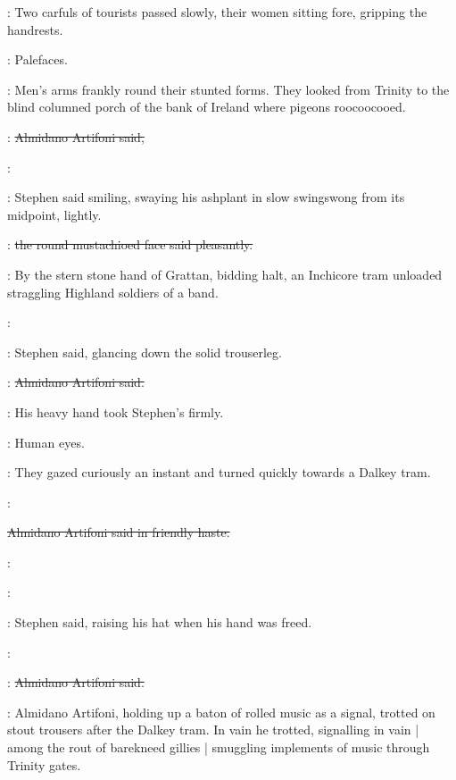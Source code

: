 :
Two carfuls of tourists passed slowly,
their women sitting fore,
gripping the handrests.

\StephenInt:
Palefaces.

:
Men's arms frankly round their stunted forms.
They looked from Trinity
to the blind columned porch of the bank of Ireland
where pigeons roocoocooed.

\artifoni:
\sout{Almidano Artifoni said,}

\Stephen:

:
Stephen said smiling,
swaying his ashplant in slow swingswong from its midpoint,
lightly.

\artifoni:
\sout{the round mustachioed face said pleasantly.}

:
By the stern stone hand of Grattan,
bidding halt,
an Inchicore tram unloaded straggling Highland soldiers of a band.

\Stephen:

:
Stephen said,
glancing down the solid trouserleg.

\artifoni:
\sout{Almidano Artifoni said.}

:
His heavy hand took Stephen's firmly.

\StephenInt:
Human eyes.

:
They gazed curiously an instant and turned quickly towards a Dalkey tram.

\artifoni:

\sout{Almidano Artifoni said in friendly haste.}

\artifoni:

\Stephen:

:
Stephen said,
raising his hat when his hand was freed.

\Stephen:

\artifoni:
\sout{Almidano Artifoni said.}

:
Almidano Artifoni,
holding up a baton of rolled music as a signal,
trotted on stout trousers after the Dalkey tram.
In vain he trotted,
signalling in vain |
among the rout of barekneed gillies |
smuggling implements of music through Trinity gates.


